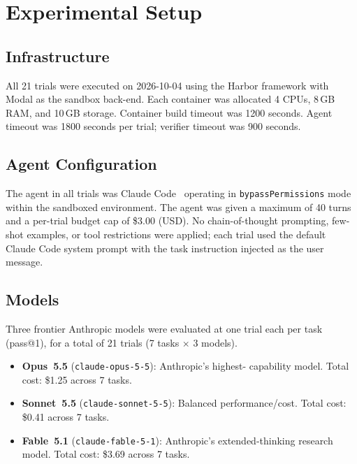 \documentclass[11pt,a4paper]{article}
\begin{document}
\section{Experimental Setup}
\label{sec:setup}

\subsection{Infrastructure}

All 21 trials were executed on 2026-10-04 using the Harbor framework
\citep{harbor2026} with Modal as the sandbox back-end.
Each container was allocated 4 CPUs, 8\,GB RAM, and 10\,GB storage.
Container build timeout was 1200 seconds.
Agent timeout was 1800 seconds per trial; verifier timeout was 900 seconds.

\subsection{Agent Configuration}

The agent in all trials was Claude Code~\citep{anthropic2026claudecode}
operating in \texttt{bypassPermissions} mode within the sandboxed environment.
The agent was given a maximum of 40 turns and a per-trial budget cap of
\$3.00 (USD).
No chain-of-thought prompting, few-shot examples, or tool restrictions were
applied; each trial used the default Claude Code system prompt with the
task instruction injected as the user message.

\subsection{Models}

Three frontier Anthropic models were evaluated at one trial each per task
(pass@1), for a total of 21 trials (7 tasks $\times$ 3 models).

\begin{itemize}[leftmargin=*]
  \item \textbf{Opus~5.5} (\texttt{claude-opus-5-5}): Anthropic's highest-
    capability model. Total cost: \$1.25 across 7 tasks.
  \item \textbf{Sonnet~5.5} (\texttt{claude-sonnet-5-5}): Balanced
    performance/cost. Total cost: \$0.41 across 7 tasks.
  \item \textbf{Fable~5.1} (\texttt{claude-fable-5-1}): Anthropic's
    extended-thinking research model. Total cost: \$3.69 across 7 tasks.
\end{itemize}
\end{document}
